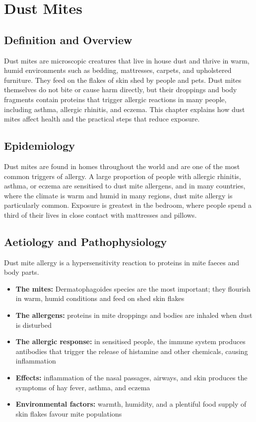 \chapter{Dust Mites}

\section*{Definition and Overview}
Dust mites are microscopic creatures that live in house dust and thrive in warm, humid environments such as bedding, mattresses, carpets, and upholstered furniture. They feed on the flakes of skin shed by people and pets. Dust mites themselves do not bite or cause harm directly, but their droppings and body fragments contain proteins that trigger allergic reactions in many people, including asthma, allergic rhinitis, and eczema. This chapter explains how dust mites affect health and the practical steps that reduce exposure.

\section*{Epidemiology}
Dust mites are found in homes throughout the world and are one of the most common triggers of allergy. A large proportion of people with allergic rhinitis, asthma, or eczema are sensitised to dust mite allergens, and in many countries, where the climate is warm and humid in many regions, dust mite allergy is particularly common. Exposure is greatest in the bedroom, where people spend a third of their lives in close contact with mattresses and pillows.

\section*{Aetiology and Pathophysiology}
Dust mite allergy is a hypersensitivity reaction to proteins in mite faeces and body parts.
\begin{itemize}
    \item \textbf{The mites:} Dermatophagoides species are the most important; they flourish in warm, humid conditions and feed on shed skin flakes
    \item \textbf{The allergens:} proteins in mite droppings and bodies are inhaled when dust is disturbed
    \item \textbf{The allergic response:} in sensitised people, the immune system produces antibodies that trigger the release of histamine and other chemicals, causing inflammation
    \item \textbf{Effects:} inflammation of the nasal passages, airways, and skin produces the symptoms of hay fever, asthma, and eczema
    \item \textbf{Environmental factors:} warmth, humidity, and a plentiful food supply of skin flakes favour mite populations
\end{itemize}

